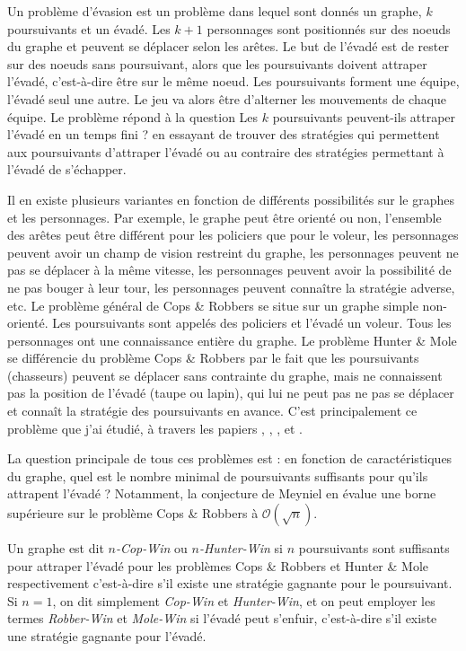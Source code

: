 \documentclass[12pt]{article}
\newcommand{\bigo}{\mathcal{O}}
\newcommand{\cp}{Cops \& Robbers\xspace}
\newcommand{\hm}{Hunter \& Mole\xspace}
\newcommand{\cad}{c'est-à-dire\xspace}
\begin{document}
Un problème d'évasion est un problème dans lequel sont donnés un graphe, $k$ poursuivants et un évadé. Les $k+1$ personnages sont positionnés sur des noeuds du graphe et peuvent se déplacer selon les arêtes. Le but de l'évadé est de rester sur des noeuds sans poursuivant, alors que les poursuivants doivent attraper l'évadé, \cad être sur le même noeud. Les poursuivants forment une équipe, l'évadé seul une autre. Le jeu va alors être d'alterner les mouvements de chaque équipe. Le problème répond à la question \og Les $k$ poursuivants peuvent-ils attraper l'évadé en un temps fini ? \fg en essayant de trouver des stratégies qui permettent aux poursuivants d'attraper l'évadé ou au contraire des stratégies permettant à l'évadé de s'échapper. 

Il en existe plusieurs variantes en fonction de différents possibilités sur le graphes et les personnages. Par exemple, le graphe peut être orienté ou non, l'ensemble des arêtes peut être différent pour les policiers que pour le voleur, les personnages peuvent avoir un champ de vision restreint du graphe, les personnages peuvent ne pas se déplacer à la même vitesse, les personnages peuvent avoir la possibilité de ne pas bouger à leur tour, les personnages peuvent connaître la stratégie adverse, etc. Le problème général de \cp se situe sur un graphe simple non-orienté. Les poursuivants sont appelés des policiers et l'évadé un voleur. Tous les personnages ont une connaissance entière du graphe. Le problème \hm se différencie du problème \cp par le fait que les poursuivants (chasseurs) peuvent se déplacer sans contrainte du graphe, mais ne connaissent pas la position de l'évadé (taupe ou lapin), qui lui ne peut pas ne pas se déplacer et connaît la stratégie des poursuivants en avance. C'est principalement ce problème que j'ai étudié, à travers les papiers \cite{komarov2013hunter}, \cite{tayy2016evasion}, \cite{abramovskaya2016hunt}, \cite{britnell2012finding} et \cite{guggiari2018approximating}.

La question principale de tous ces problèmes est : en fonction de caractéristiques du graphe, quel est le nombre minimal de poursuivants suffisants pour qu'ils attrapent l'évadé ? Notamment, la conjecture de Meyniel en évalue une borne supérieure sur le problème \cp à $\bigo(\sqrt{n})$.

Un graphe est dit \emph{$n$-Cop-Win} ou \emph{$n$-Hunter-Win} si $n$ poursuivants sont suffisants pour attraper l'évadé pour les problèmes \cp et \hm respectivement \cad s'il existe une stratégie gagnante pour le poursuivant. Si $n=1$, on dit simplement \emph{Cop-Win} et \emph{Hunter-Win}, et on peut employer les termes \emph{Robber-Win} et \emph{Mole-Win} si l'évadé peut s'enfuir, \cad s'il existe une stratégie gagnante pour l'évadé.
\end{document}
